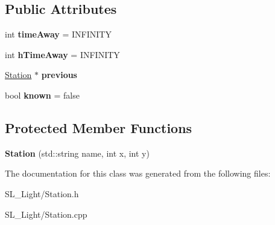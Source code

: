 \subsection*{Public Attributes}
\begin{DoxyCompactItemize}
\item 
\mbox{\label{class_station_ae3cc111992205ec74e5d3b5ba8541b31}} 
int {\bfseries time\+Away} = I\+N\+F\+I\+N\+I\+TY
\item 
\mbox{\label{class_station_ad73a90183ca8da7b259695e90e4a0d95}} 
int {\bfseries h\+Time\+Away} = I\+N\+F\+I\+N\+I\+TY
\item 
\mbox{\label{class_station_a465cf1c945f9197f5b45e9a1bb898543}} 
\mbox{\hyperlink{class_station}{Station}} $\ast$ {\bfseries previous}
\item 
\mbox{\label{class_station_a2c55009562b413dadb86d0e040424832}} 
bool {\bfseries known} = false
\end{DoxyCompactItemize}
\subsection*{Protected Member Functions}
\begin{DoxyCompactItemize}
\item 
\mbox{\label{class_station_ae136c6cba0e6f4d3a33d0b6e6d0082de}} 
{\bfseries Station} (std\+::string name, int x, int y)
\end{DoxyCompactItemize}


The documentation for this class was generated from the following files\+:\begin{DoxyCompactItemize}
\item 
S\+L\+\_\+\+Light/Station.\+h\item 
S\+L\+\_\+\+Light/Station.\+cpp\end{DoxyCompactItemize}

